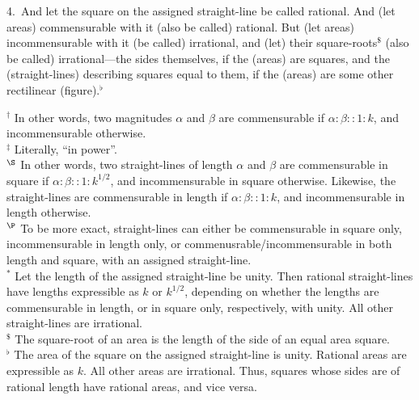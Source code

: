 \begin{Parallel}{}{}
{4.~And let the square on the assigned straight-line be called  rational. And (let areas) commensurable with it (also be called) rational. But  (let areas) incommensurable with it (be called) irrational, and (let) their square-roots$^\$$ (also be called) irrational---the sides themselves, if the (areas)
are squares, and the (straight-lines) describing squares equal to them, if the (areas) are some other rectilinear (figure).$^\flat$}
\end{Parallel}

{\footnotesize\noindent $^\dag$ In other words, two magnitudes $\alpha$ and
$\beta$ are commensurable if $\alpha:\beta::1:k$, and incommensurable otherwise.\\[0.5ex]
$^\ddag$ Literally, ``in power''.\\[0.5ex]
$^\S$  In other words, two straight-lines of length $\alpha$ and $\beta$ are commensurable in square if $\alpha : \beta::1:k^{1/2}$,  and incommensurable in square otherwise. Likewise, the straight-lines
are commensurable in length if $\alpha:\beta::1:k$, and incommensurable in length otherwise.\\[0.5ex]
$^\P$ To be more exact, straight-lines can either be commensurable in square only, incommensurable in length only, or commenusrable/incommensurable in both
length and square, with an assigned straight-line.\\[0.5ex]
$^\ast$ Let the length of the assigned straight-line be unity. Then rational
straight-lines have lengths expressible as $k$ or $k^{1/2}$, depending on whether the lengths are commensurable in length, or in square only, respectively,
with unity.  All other straight-lines are irrational.\\[0.5ex]
$^\$$ The square-root of an area is the length of the side of an equal area square.\\[0.5ex]
$^\flat$ The area of the  square 
on the assigned straight-line is unity. Rational areas are expressible as $k$.  All other areas are irrational. Thus, squares whose
sides are of rational length have  rational areas, and {\rm vice versa}.}

